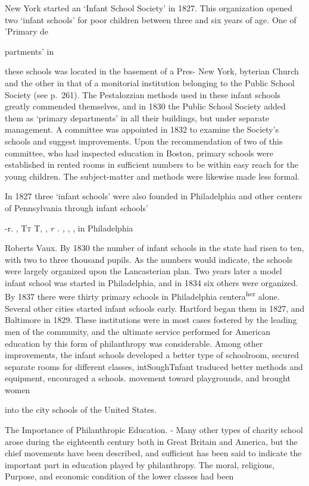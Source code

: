 \documentclass[
]{book}
\begin{document}
New York started an `Infant School Society' in 1827. This organization opened two `infant schools' for poor children between three and six years of age. One of 'Primary de

partments' in

these schools was located in the basement of a Pres- New York, byterian Church and the other in that of a monitorial institution belonging to the Public School Society (see p.~261). The Pestalozzian methods used in these infant schools greatly commended themselves, and in 1830 the Public School Society added them as `primary departments' in all their buildings, but under separate management. A committee was appointed in 1832 to examine the Society's schools and suggest improvements. Upon the recommendation of two of this committee, who had inspected education in Boston, primary schools were established in rented rooms in sufficient numbers to be within easy reach for the young children. The subject-matter and methods were likewise made less formal.

In 1827 three `infant schools' were also founded in Philadelphia and other centers of Pennsylvania through infant schools'

-r. , \textsc{Tt }\textsc{T, }, \emph{r . ,} , , in Philadelphia

Roberts Vaux. By 1830 the number of infant schools in the state had risen to ten, with two to three thousand pupils. As the numbers would indicate, the schools were largely organized upon the Lancasterian plan.\protect\hypertarget{ch20.xmlux5cux23para.309.1.0.box.73.228.1267.691.q.60}{}{ Two years later a model infant school was started in Philadelphia, and in 1834 six others were organized. By 1837 there were thirty primary schools in Philadelphia centera\textsuperscript{her} alone. Several other cities started infant schools early. Hartford began them in 1827, and Baltimore in 1829. These institutions were in most cases fostered by the leading men of the community, and the ultimate service performed for American education by this form of philanthropy was considerable. Among other improvements, the infant schools developed a better type of schoolroom, secured separate rooms for different classes, intSoughTnfant traduced better methods and equipment, encouraged a schools. movement toward playgrounds, and brought women}

into the city schools of the United States.

The Importance of Philanthropic Education. - Many other types of charity school arose during the eighteenth century both in Great Britain and America, but the chief movements have been described, and sufficient has been said to indicate the important part in education played by philanthropy. The moral, religious, Purpose, and economic condition of the lower classes had been
\end{document}
